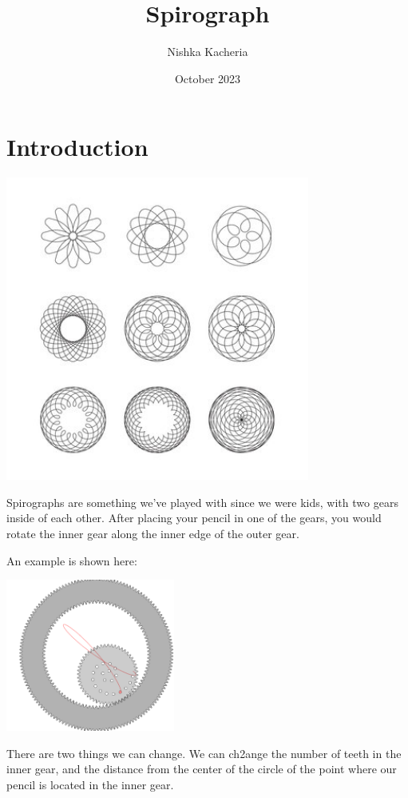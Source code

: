 \documentclass{article}
\title{Spirograph}
\author{Nishka Kacheria}
\date{October 2023}
\begin{document}
\maketitle

\section{Introduction}
\begin{center}
\includegraphics[height=10cm]{images/Spirograph Examples.jpg}
\end{center}

Spirographs are something we've played with since we were kids, with two gears inside of each other. After placing your pencil in one of the gears, you would rotate the inner gear along the inner edge of the outer gear. 

An example is shown here:

\begin{center}
\includegraphics[height=5cm]{images/Spirograph Example.png}
\end{center}

There are two things we can change. We can ch2ange the number of teeth in the inner gear, and the distance from the center of the circle of the point where our pencil is located in the inner gear.
\end{document}
